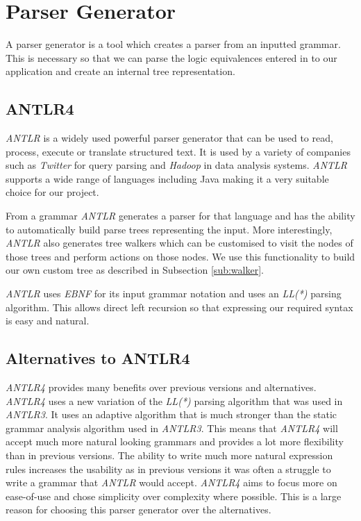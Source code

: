 \documentclass[draft]{report}
\begin{document}
\section{Parser Generator}

A parser generator is a tool which creates a parser from an inputted grammar. This is necessary so that we can parse the logic equivalences entered in to our application and create an internal tree representation.

\subsection{ANTLR4}

\emph{ANTLR} is a widely used powerful parser generator that can be used to read, process, execute or translate structured text. It is used by a variety of companies such as \emph{Twitter} for query parsing and \emph{Hadoop} in data analysis systems. \emph{ANTLR} supports a wide range of languages including Java making it a very suitable choice for our project.

From a grammar \emph{ANTLR} generates a parser for that language and has the ability to automatically build parse trees representing the input. More interestingly, \emph{ANTLR} also generates tree walkers which can be customised to visit the nodes of those trees and perform actions on those nodes. We use this functionality to build our own custom tree as described in Subsection \ref{sub:walker}.

\emph{ANTLR} uses \emph{EBNF} for its input grammar notation and uses an \emph{LL(*)} parsing algorithm. This allows direct left recursion so that expressing our required syntax is easy and natural. 

\subsection{Alternatives to ANTLR4}
\label{sub:alternatives_to_antlr4}

\emph{ANTLR4} provides many benefits over previous versions and alternatives. \emph{ANTLR4} uses a new variation of the \emph{LL(*)} parsing algorithm that was used in \emph{ANTLR3}. It uses an adaptive algorithm that is much stronger than the static grammar analysis algorithm used in \emph{ANTLR3}. This means that \emph{ANTLR4} will accept much more natural looking grammars and provides a lot more flexibility than in previous versions. The ability to write much more natural expression rules increases the usability as in previous versions it was often a struggle to write a grammar that \emph{ANTLR} would accept. \emph{ANTLR4} aims to focus more on ease-of-use and chose simplicity over complexity where possible. This is a large reason for choosing this parser generator over the alternatives.
\end{document}
